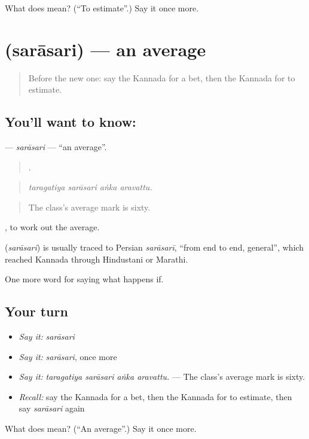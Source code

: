 \begin{tcolorbox}[breakable,colback=teal!4,colframe=teal!35!black,title={Before you move on}]
What does  mean? (\textquotedblleft{}To estimate\textquotedblright{}.) Say it once more.
\end{tcolorbox}
\section[\texorpdfstring{\kn{ಸರಾಸರಿ} (sarāsari)}{ಸರಾಸರಿ (sarāsari)}]{ (sarāsari) — an average}

\label{lesson:KA-C413-sarasari}



\begin{quote}
Before the new one: say the Kannada for a bet, then the Kannada for to estimate.
\end{quote}

\subsection*{You'll want to know: }
\textbf{} — \emph{sarāsari} — \textquotedblleft{}an average\textquotedblright{}.

\begin{quote}
   .
\end{quote}

\begin{quote}
\emph{taragatiya sarāsari aṅka aravattu.}
\end{quote}

\begin{quote}
The class's average mark is sixty.
\end{quote}

 , to work out the average.

\begin{cousinweb}
\textbf{} (\emph{sarāsari}) is usually traced to Persian \emph{sarāsarī}, \textquotedblleft{}from end to end, general\textquotedblright{}, which reached Kannada through Hindustani or Marathi.
\end{cousinweb}

\begin{grammarlens}[title={What you've built}]
One more word for saying what happens if.
\end{grammarlens}

\subsection*{Your turn}
\begin{itemize}
\raggedright
  \item \emph{Say it:} \emph{sarāsari}
  \item \emph{Say it:} \emph{sarāsari}, once more
  \item \emph{Say it:} \emph{taragatiya sarāsari aṅka aravattu.} — The class's average mark is sixty.
  \item \emph{Recall:} say the Kannada for a bet, then the Kannada for to estimate, then say \emph{sarāsari} again
\end{itemize}

\begin{tcolorbox}[breakable,colback=teal!4,colframe=teal!35!black,title={Before you move on}]
What does  mean? (\textquotedblleft{}An average\textquotedblright{}.) Say it once more.
\end{tcolorbox}
